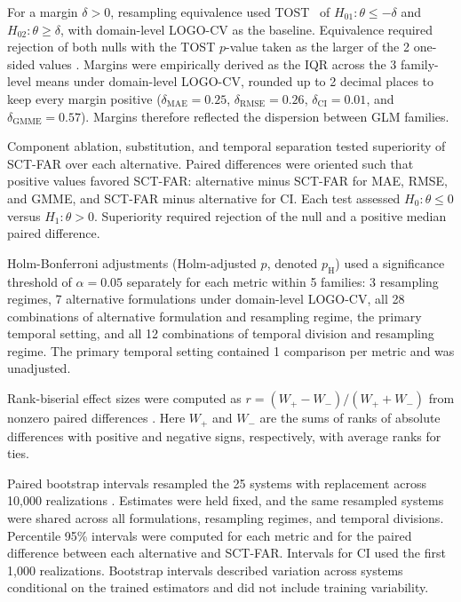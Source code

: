 \documentclass{article}
\begin{document}
For a margin $\delta > 0$, resampling equivalence used TOST~\citep{ref47} of $H_{01}: \theta \le -\delta$ and $H_{02}: \theta \ge \delta$, with domain-level LOGO-CV as the baseline. Equivalence required rejection of both nulls with the TOST $p$-value taken as the larger of the 2 one-sided values \citep{ref78}. Margins were empirically derived as the IQR across the 3 family-level means under domain-level LOGO-CV, rounded up to 2 decimal places to keep every margin positive ($\delta_{\mathrm{MAE}} = 0.25$, $\delta_{\mathrm{RMSE}} = 0.26$, $\delta_{\mathrm{CI}} = 0.01$, and $\delta_{\mathrm{GMME}} = 0.57$). Margins therefore reflected the dispersion between GLM families.

Component ablation, substitution, and temporal separation tested superiority of SCT-FAR over each alternative. Paired differences were oriented such that positive values favored SCT-FAR: alternative minus SCT-FAR for MAE, RMSE, and GMME, and SCT-FAR minus alternative for CI. Each test assessed $H_0: \theta \le 0$ versus $H_1: \theta > 0$. Superiority required rejection of the null and a positive median paired difference.

Holm-Bonferroni adjustments (Holm-adjusted $p$, denoted $p_{\mathrm H}$) \citep{ref46} used a significance threshold of $\alpha = 0.05$ separately for each metric within 5 families: 3 resampling regimes, 7 alternative formulations under domain-level LOGO-CV, all 28 combinations of alternative formulation and resampling regime, the primary temporal setting, and all 12 combinations of temporal division and resampling regime. The primary temporal setting contained 1 comparison per metric and was unadjusted.

Rank-biserial effect sizes were computed as $r = (W_{+} - W_{-})/(W_{+} + W_{-})$ from nonzero paired differences \citep{ref71}. Here $W_{+}$ and $W_{-}$ are the sums of ranks of absolute differences with positive and negative signs, respectively, with average ranks for ties.

Paired bootstrap intervals resampled the 25 systems with replacement across 10,000 realizations \citep{ref75,ref176}. Estimates were held fixed, and the same resampled systems were shared across all formulations, resampling regimes, and temporal divisions. Percentile 95\% intervals were computed for each metric and for the paired difference between each alternative and SCT-FAR. Intervals for CI used the first 1,000 realizations. Bootstrap intervals described variation across systems conditional on the trained estimators and did not include training variability.
\end{document}
